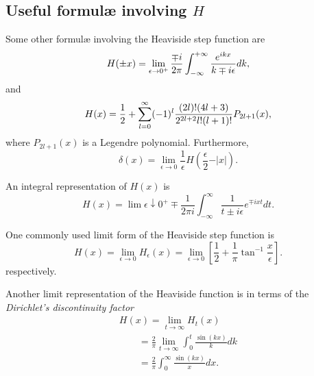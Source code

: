 \subsection{Useful formul\ae{} involving $H$}

Some other formul\ae{}  involving the Heaviside step function
are
 \begin{equation}
H (\pm x)=\lim_{\epsilon \rightarrow 0^+}{\mp i\over 2\pi
 }\int_{-\infty}^{+\infty} {e^{ikx}\over k\mp i\epsilon}dk,
 \end{equation}
and
 \begin{equation}
H (x)
={1\over 2}
+
\sum_{l=0}^\infty (-1)^l {(2l)!(4l+3)\over 2^{2l+2}l!(l+1)!}
P_{2l+1} (x),
 \end{equation}
where $P_{2l+1} (x)$ is a Legendre polynomial.
Furthermore,
\begin{equation}
\delta(x)=
\lim_{\epsilon \rightarrow 0}  \frac{1}{\epsilon } H\left( \frac{\epsilon }{2} -\vert x\vert\right) .
\end{equation}

An integral representation of $H(x)$ is
 \begin{equation}
H (x)
=\lim{\epsilon \downarrow 0^+} \mp \frac{1}{2\pi i}
\int_{-\infty}^\infty
 \frac{1}{t \pm i\epsilon}e^{\mp ixt} dt.
 \end{equation}


One commonly used limit form  of the Heaviside step function is
\begin{equation}
H(x)= \lim_{\epsilon \rightarrow 0} H_\epsilon (x)=\lim_{\epsilon \rightarrow 0}   \left[ \frac{1 }{2} + \frac{1 }{\pi} \tan^{-1}  \frac{x}{\epsilon } \right] .
\end{equation}
respectively.

Another limit representation of the Heaviside function is in terms of the
{\em Dirichlet's discontinuity factor}
\begin{equation}
\begin{split}
H(x)= \lim_{t \rightarrow \infty} H_t (x)
\\ \qquad
= \frac{2}{\pi }\lim_{t \rightarrow \infty}\int_0^t \frac{\sin (kx)}{k} dk
\\
\qquad
=
 \frac{2}{\pi }\int_0^\infty \frac{\sin (kx)}{x} dx
.
\end{split}
\label{2012-m-ch-di-dcf}
\end{equation}

